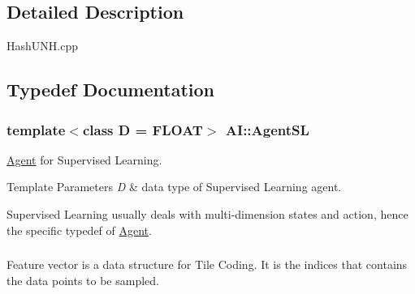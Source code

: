 \subsection{Detailed Description}
Hash\-U\-N\-H.\-cpp 

\subsection{Typedef Documentation}
\hypertarget{namespaceAI_acd3da5a0aa6fc3b0e9988d4a6251bdbd}{
\subsubsection[{Agent\-S\-L}]{\setlength{\rightskip}{0pt plus 5cm}template$<$class D  = F\-L\-O\-A\-T$>$ {\bf A\-I\-::\-Agent\-S\-L}}}\label{namespaceAI_acd3da5a0aa6fc3b0e9988d4a6251bdbd}


\hyperlink{classAI_1_1Agent}{Agent} for Supervised Learning. 


\begin{DoxyTemplParams}{Template Parameters}
{\em D} & data type of Supervised Learning agent.\\
\hline
\end{DoxyTemplParams}
Supervised Learning usually deals with multi-\/dimension states and action, hence the specific typedef of \hyperlink{classAI_1_1Agent}{Agent}. \hypertarget{namespaceAI_a23a39e1b301a5c1345fa508796940631}{
\subsubsection[{F\-E\-A\-T\-U\-R\-E\-\_\-\-V\-E\-C\-T\-O\-R}]{}}\label{namespaceAI_a23a39e1b301a5c1345fa508796940631}
Feature vector is a data structure for Tile Coding. It is the indices that contains the data points to be sampled. 